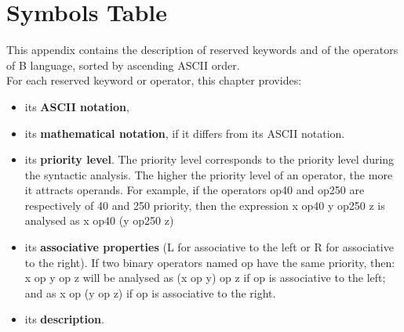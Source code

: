 \chapter*{Symbols Table}

This appendix contains the description of reserved keywords and of the operators of B language, sorted by ascending ASCII order.\\
For each reserved keyword or operator, this chapter provides:
\begin{itemize}
    \item its \textbf{ASCII notation}, 
    \item its \textbf{mathematical notation}, if it differs from its ASCII notation.
    \item its \textbf{priority level}. The priority level corresponds to the priority level during the syntactic analysis. The higher the priority level of an operator, the more it attracts operands. For example, if the operators op40 and op250 are respectively of 40 and 250 priority, then the expression x op40 y op250 z is analysed as x op40 (y op250 z)
    \item its \textbf{associative properties} (L for associative to the left or R for associative to the right). If two binary operators named op have the same priority, then: x op y op z will be analysed as (x op y) op z if op is associative to the left; and as x op (y op z) if op is associative to the right.
    \item its \textbf{description}.
\end{itemize}


